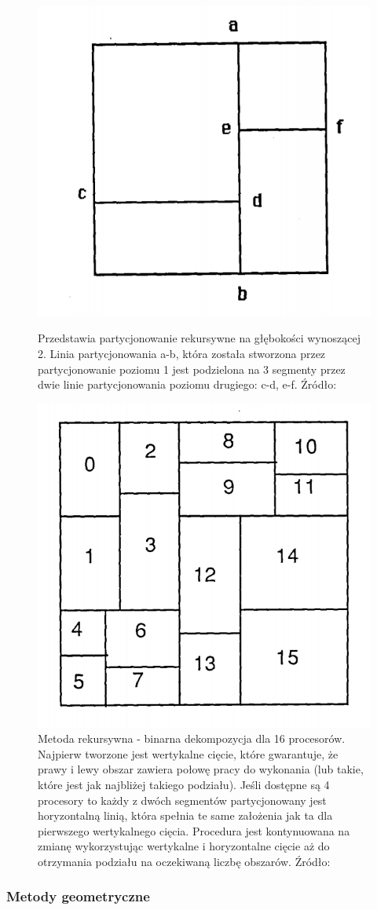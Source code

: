 \begin{figure}[h]
    \centering
    \includegraphics[width=0.3\linewidth]{images/recursive}
    \caption{Przedstawia partycjonowanie rekursywne na głębokości wynoszącej 2. Linia partycjonowania a-b, która została stworzona
    przez partycjonowanie poziomu 1 jest podzielona na 3 segmenty przez dwie linie partycjonowania poziomu drugiego:
    c-d, e-f. Źródło: \cite{recursive}}
    \label{im:recursive_partitioning}

    \includegraphics[width=0.3\linewidth]{images/recursive-part}
    \caption{Metoda rekursywna - binarna dekompozycja dla 16 procesorów. Najpierw tworzone jest wertykalne cięcie,
        które gwarantuje, że prawy i lewy obszar
        zawiera połowę pracy do wykonania (lub takie, które jest jak najbliżej takiego podziału). Jeśli dostępne
        są 4 procesory to każdy z dwóch segmentów partycjonowany jest horyzontalną linią, która spełnia te same założenia
        jak ta dla pierwszego wertykalnego cięcia. Procedura jest kontynuowana na zmianę wykorzystując wertykalne i
        horyzontalne cięcie aż do otrzymania podziału na oczekiwaną liczbę obszarów. Źródło: \cite{recursive}}
    \label{im:rec_partitioning}
\end{figure}

\newpage
\subsubsection{Metody geometryczne}

